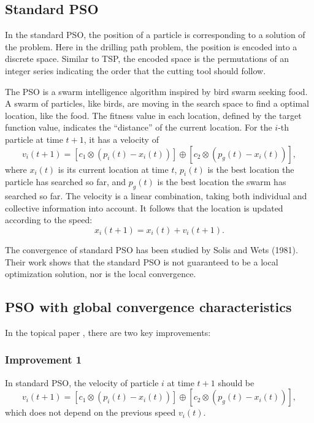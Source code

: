\documentclass{IEEEtran}
\begin{document}
{    \subsection{Standard PSO}
    {
        In the standard PSO, the position of a particle is corresponding to a solution of the problem.
        Here in the drilling path problem, the position is encoded into a discrete space.
        Similar to TSP, the encoded space is the permutations of an integer series indicating the order that the cutting tool should follow.

        The PSO is a swarm intelligence algorithm inspired by bird swarm seeking food. 
        A swarm of particles, like birds, are moving in the search space to find a optimal location, like the food.
        The fitness value in each location, defined by the target function value, indicates the ``distance'' of the current location.
        For the $i$-th particle at time $t+1$, it has a velocity of 
        $$v_i(t+1) = [c_1 \otimes (p_i(t) - x_i(t))] \oplus [c_2 \otimes (p_g(t) - x_i(t))],$$
        where $x_i(t)$ is its current location at time $t$, 
        $p_i(t)$ is the best location the particle has searched so far, 
        and $p_g(t)$ is the best location the swarm has searched so far.
        The velocity is a linear combination, taking both individual and collective information into account.
        It follows that the location is updated according to the speed:
        $$x_i(t+1) = x_i(t) + v_i(t+1).$$

        The convergence of standard PSO has been studied by Solis and Wets (1981). 
        Their work shows that the standard PSO is not guaranteed to be a local optimization solution, nor is the local convergence.
    }

    \subsection{PSO with global convergence characteristics}
    {
        In the topical paper \cite{zhu2008drilling}, there are two key improvements:

        \subsubsection{Improvement 1}
        {
            In standard PSO, the velocity of particle $i$ at time $t+1$ should be
            $$v_i(t+1) = [c_1 \otimes (p_i(t) - x_i(t))] \oplus [c_2 \otimes (p_g(t) - x_i(t))],$$
            which does not depend on the previous speed $v_i(t)$.
        
}}}
\end{document}
